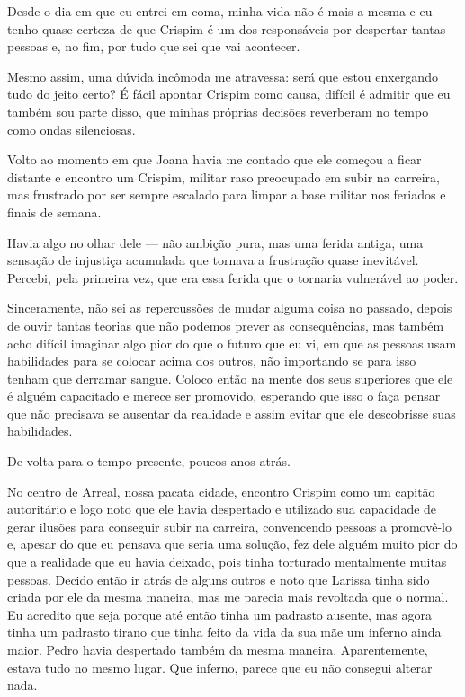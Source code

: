 Desde o dia em que eu entrei em coma, minha vida não é mais a mesma e eu tenho quase certeza de que Crispim é um dos responsáveis por despertar tantas pessoas e, no fim, por tudo que sei que vai acontecer.

Mesmo assim, uma dúvida incômoda me atravessa: será que estou enxergando tudo do jeito certo? É fácil apontar Crispim como causa, difícil é admitir que eu também sou parte disso, que minhas próprias decisões reverberam no tempo como ondas silenciosas.

Volto ao momento em que Joana havia me contado que ele começou a ficar distante e encontro um Crispim, militar raso preocupado em subir na carreira, mas frustrado por ser sempre escalado para limpar a base militar nos feriados e finais de semana.

Havia algo no olhar dele — não ambição pura, mas uma ferida antiga, uma sensação de injustiça acumulada que tornava a frustração quase inevitável. Percebi, pela primeira vez, que era essa ferida que o tornaria vulnerável ao poder.

Sinceramente, não sei as repercussões de mudar alguma coisa no passado, depois de ouvir tantas teorias que não podemos prever as consequências, mas também acho difícil imaginar algo pior do que o futuro que eu vi, em que as pessoas usam habilidades para se colocar acima dos outros, não importando se para isso tenham que derramar sangue. Coloco então na mente dos seus superiores que ele é alguém capacitado e merece ser promovido, esperando que isso o faça pensar que não precisava se ausentar da realidade e assim evitar que ele descobrisse suas habilidades.

De volta para o tempo presente, poucos anos atrás.

No centro de Arreal, nossa pacata cidade, encontro Crispim como um capitão autoritário e logo noto que ele havia despertado e utilizado sua capacidade de gerar ilusões para conseguir subir na carreira, convencendo pessoas a promovê-lo e, apesar do que eu pensava que seria uma solução, fez dele alguém muito pior do que a realidade que eu havia deixado, pois tinha torturado mentalmente muitas pessoas. Decido então ir atrás de alguns outros e noto que Larissa tinha sido criada por ele da mesma maneira, mas me parecia mais revoltada que o normal. Eu acredito que seja porque até então tinha um padrasto ausente, mas agora tinha um padrasto tirano que tinha feito da vida da sua mãe um inferno ainda maior. Pedro havia despertado também da mesma maneira. Aparentemente, estava tudo no mesmo lugar. Que inferno, parece que eu não consegui alterar nada.

